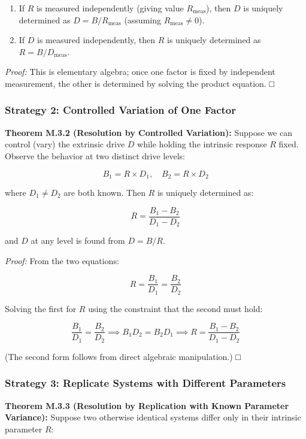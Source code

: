 \documentclass[
]{article}
\providecommand{\tightlist}{%
  \setlength{\itemsep}{0pt}\setlength{\parskip}{0pt}}
\begin{document}
\begin{enumerate}
\def\labelenumi{\arabic{enumi}.}
\tightlist
\item
  If \(R\) is measured independently (giving value \(R_{\text{meas}}\)),
  then \(D\) is uniquely determined as \(D = B / R_{\text{meas}}\)
  (assuming \(R_{\text{meas}} \neq 0\)).
\item
  If \(D\) is measured independently, then \(R\) is uniquely determined
  as \(R = B / D_{\text{meas}}\).
\end{enumerate}

\emph{Proof:} This is elementary algebra; once one factor is fixed by
independent measurement, the other is determined by solving the product
equation. □

\subsubsection{Strategy 2: Controlled Variation of One
Factor}\label{strategy-2-controlled-variation-of-one-factor}

\textbf{Theorem M.3.2 (Resolution by Controlled Variation):} Suppose we
can control (vary) the extrinsic drive \(D\) while holding the intrinsic
response \(R\) fixed. Observe the behavior at two distinct drive levels:

\[B_1 = R \times D_1, \quad B_2 = R \times D_2\]

where \(D_1 \neq D_2\) are both known. Then \(R\) is uniquely determined
as:

\[R = \frac{B_1 - B_2}{D_1 - D_2}\]

and \(D\) at any level is found from \(D = B / R\).

\emph{Proof:} From the two equations:

\[R = \frac{B_1}{D_1} = \frac{B_2}{D_2}\]

Solving the first for \(R\) using the constraint that the second must
hold:

\[\frac{B_1}{D_1} = \frac{B_2}{D_2} \implies B_1 D_2 = B_2 D_1 \implies R = \frac{B_1 - B_2}{D_1 - D_2}\]

(The second form follows from direct algebraic manipulation.) □

\subsubsection{Strategy 3: Replicate Systems with Different
Parameters}\label{strategy-3-replicate-systems-with-different-parameters}

\textbf{Theorem M.3.3 (Resolution by Replication with Known Parameter
Variance):} Suppose two otherwise identical systems differ only in their
intrinsic parameter \(R\):
\end{document}

